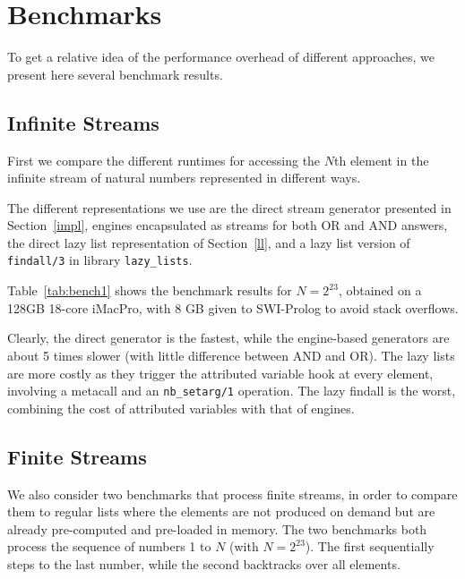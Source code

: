 \documentclass[submission,copyright,creativecommons]{eptcs}
\begin{document}
\section{Benchmarks}\label{appendix}

To get a relative idea of the performance overhead of different approaches,
we  present here several benchmark results.

\subsection{Infinite Streams}

First we compare  the different runtimes for accessing the $N$th element in the
infinite stream of natural numbers represented in different ways.

The different representations we use are the direct stream generator
presented in Section~\ref{impl}, engines encapsulated as streams for both OR
and AND answers, the direct lazy list representation of Section~\ref{ll}, and
a lazy list version of {\tt findall/3} in library {\tt lazy\_lists}.

Table~\ref{tab:bench1} shows the benchmark results for $N = 2^{23}$, obtained on a
128GB 18-core iMacPro, with 8 GB given to SWI-Prolog to avoid stack overflows.

Clearly, the direct generator is the fastest, while the engine-based generators
are about 5 times slower (with little difference between AND and OR). The lazy
lists are more costly as they trigger the attributed variable hook at every
element, involving a metacall and an {\tt nb\_setarg/1} operation. The lazy findall is the worst, combining the cost of attributed
variables with that of engines.

\subsection{Finite Streams}

We also consider two benchmarks that process finite streams, in order to compare them to regular
lists where the elements are not produced on demand but are already pre-computed and pre-loaded
in memory. The two benchmarks both process the sequence of numbers 1 to $N$ (with $N=2^{23}$). 
The first sequentially steps to the last number, while the second backtracks over all elements.
\end{document}
